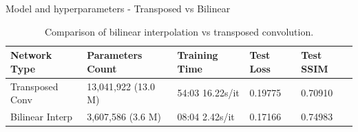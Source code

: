 \documentclass[footline=authortitle]{beamer}
\begin{document}
\begin{frame}{Model and hyperparameters - Transposed vs Bilinear}

    \begin{table}[ht]
        \centering
        \scriptsize
        \begin{tabular}{|l|l|l|l|l|}
        \hline
        \textbf{Network Type} & \textbf{Parameters Count} & \textbf{Training Time} & \textbf{Test Loss} & \textbf{Test SSIM} \\
        \hline
        Transposed Conv & 13,041,922 (13.0 M) & 54:03 16.22s/it & 0.19775 & 0.70910 \\
        Bilinear Interp & 3,607,586 (3.6 M) & 08:04 2.42s/it & 0.17166 & 0.74983 \\
        \hline
        \end{tabular}
        \caption{Comparison of bilinear interpolation vs transposed convolution.}
        \label{tab:network_comparison}
    \end{table}
\end{frame}
\end{document}
